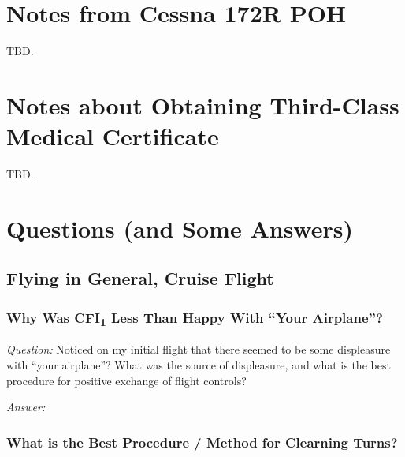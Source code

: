 \documentclass[letterpaper,10pt,titlepage]{article}
\begin{document}
\section{Notes from Cessna 172R POH}
\label{snrc0}

TBD.



\section{Notes about Obtaining Third-Class Medical Certificate}
\label{stcm0}

TBD.


\section{Questions (and Some Answers)}
\label{sqsa0}



\subsection{Flying in General, Cruise Flight}
\label{sqsa0:sfig0}


\subsubsection{Why Was CFI\textsubscript{1} Less Than Happy With ``Your Airplane''?}
\label{sqsa0:sfig0:slhy0}

\emph{Question:} Noticed on my initial flight that there seemed to be some
displeasure with ``your airplane''?  What was the source of displeasure, and what
is the best procedure for positive exchange of flight controls?

\noindent{}\emph{Answer:}


\subsubsection{What is the Best Procedure / Method for Clearning Turns?}
\label{sqsa0:sfig0:sclt0}
\end{document}
